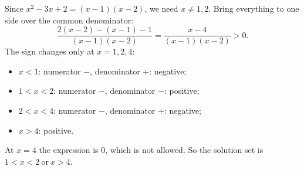 Since $x^2-3x+2=(x-1)(x-2)$, we need $x\ne1,2$. Bring everything to one side over the common denominator:
\[
\dfrac{2(x-2)-(x-1)-1}{(x-1)(x-2)}=\dfrac{x-4}{(x-1)(x-2)}>0 .
\]
The sign changes only at $x=1,2,4$:
\begin{itemize}
\item $x<1$: numerator $-$, denominator $+$: negative;
\item $1<x<2$: numerator $-$, denominator $-$: positive;
\item $2<x<4$: numerator $-$, denominator $+$: negative;
\item $x>4$: positive.
\end{itemize}
At $x=4$ the expression is $0$, which is not allowed. So the solution set is $\boxed{1<x<2\ \text{or}\ x>4}$.
